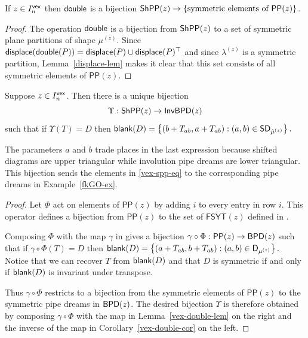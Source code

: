 \documentclass[10pt]{article}
\begin{document}
\begin{lemma}\label{vex-double-lem}
If $z \in I^{\mathsf{vex}}_n$ then $\mathsf{double}$ is a bijection $\mathsf{ShPP}(z) \to \{ \text{symmetric elements of } \mathsf{PP}(z) \}$.
\end{lemma}

\begin{proof}
The operation $\mathsf{double}$ is a bijection from $\mathsf{ShPP}(z)$ to a set of symmetric plane partitions of shape $\mu^{(z)}$.
Since $\mathsf{displace}(\mathsf{double}(P)) = \mathsf{displace}(P) \cup \mathsf{displace}(P)^\top$ and since $\lambda^{(z)}$ is a symmetric partition, Lemma~\ref{displace-lem}
makes it clear that this set consists of all 
symmetric elements of $\mathsf{PP}(z)$.
\end{proof}

\begin{theorem}\label{bij-thm}
Suppose  $z \in I^{\mathsf{vex}}_n $. Then there is a unique bijection
\[
\Upsilon : \mathsf{ShPP}(z) \to \mathsf{InvBPD}(z) 
\]
such that  if $\Upsilon(T) = D$ then
$ \mathsf{blank}(D) = 
 \left\{(b+T_{ab}, a+T_{ab}) : (a,b) \in \mathsf{SD}_{\hat\mu^{(z)}}\right\}.
$
\end{theorem}

The parameters $a$ and $b$ trade places in the last expression because shifted diagrams are upper triangular while involution pipe dreams are lower triangular.
This bijection sends the elements in \eqref{vex-spp-eq} to the corresponding pipe dreams in 
Example~\ref{fkGO-ex}.

\begin{proof}
Let $\Phi$ act on elements of $\mathsf{PP}(z)$ by adding $i$ to every entry in row $i$.
This operator defines a bijection from $\mathsf{PP}(z)$ to the set of  $\mathsf{FSYT}(z)$ defined in \cite[\S7.1]{Weigandt}. 

Composing $\Phi$ with the map $\gamma$ in \cite[Thm~7.7]{Weigandt} 
gives a bijection $\gamma \circ \Phi: \mathsf{PP}(z) \to \mathsf{BPD}(z)$
such that if $\gamma\circ \Phi(T) = D$
then 
$ \mathsf{blank}(D) = 
 \left\{(a+T_{ab}, b+T_{ab}) : (a,b) \in \mathsf{D}_{\mu^{(z)}}\right\}.
$
Notice that we can recover $T$ from $\mathsf{blank}(D)$ and that $D$ is symmetric if and only if $\mathsf{blank}(D)$ is invariant under transpose.

Thus $\gamma \circ \Phi$
restricts to a bijection from the symmetric elements of $ \mathsf{PP}(z)$ 
to the symmetric pipe dreams in $\mathsf{BPD}(z)$. The desired bijection
$\Upsilon$ is therefore obtained by composing $\gamma \circ \Phi$ with the map in Lemma~\ref{vex-double-lem} on the right and the inverse
of the map in Corollary~\ref{vex-double-cor} on the left.
\end{proof}
\end{document}
